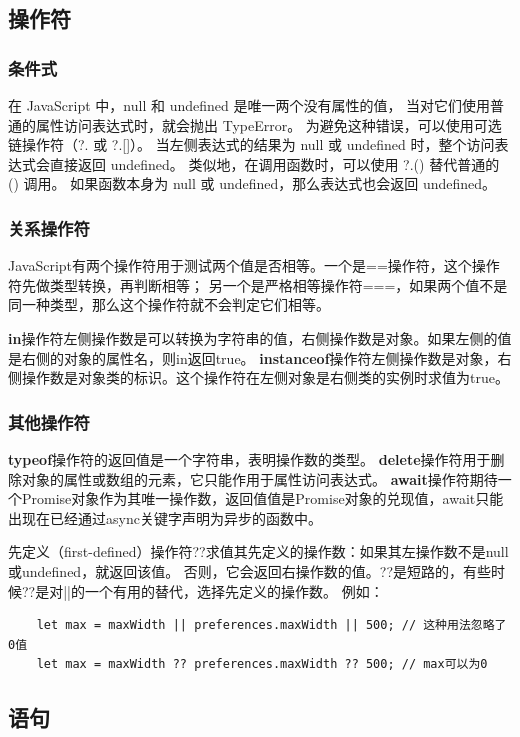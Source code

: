\subsection{操作符}
\subsubsection{条件式}
在 JavaScript 中，null 和 undefined 是唯一两个没有属性的值，
当对它们使用普通的属性访问表达式时，就会抛出 TypeError。
为避免这种错误，可以使用可选链操作符（?. 或 ?.[]）。
当左侧表达式的结果为 null 或 undefined 时，整个访问表达式会直接返回 undefined。
类似地，在调用函数时，可以使用 ?.() 替代普通的 () 调用。
如果函数本身为 null 或 undefined，那么表达式也会返回 undefined。

\subsubsection{关系操作符}
JavaScript有两个操作符用于测试两个值是否相等。一个是==操作符，这个操作符先做类型转换，再判断相等；
另一个是严格相等操作符===，如果两个值不是同一种类型，那么这个操作符就不会判定它们相等。

\textbf{in}操作符左侧操作数是可以转换为字符串的值，右侧操作数是对象。如果左侧的值是右侧的对象的属性名，则in返回true。
\textbf{instanceof}操作符左侧操作数是对象，右侧操作数是对象类的标识。这个操作符在左侧对象是右侧类的实例时求值为true。

\subsubsection{其他操作符}
\textbf{typeof}操作符的返回值是一个字符串，表明操作数的类型。
\textbf{delete}操作符用于删除对象的属性或数组的元素，它只能作用于属性访问表达式。
\textbf{await}操作符期待一个Promise对象作为其唯一操作数，返回值值是Promise对象的兑现值，await只能出现在已经通过async关键字声明为异步的函数中。

先定义（first-defined）操作符??求值其先定义的操作数：如果其左操作数不是null或undefined，就返回该值。
否则，它会返回右操作数的值。??是短路的，有些时候??是对||的一个有用的替代，选择先定义的操作数。
例如：
\begin{verbatim}
    let max = maxWidth || preferences.maxWidth || 500; // 这种用法忽略了0值
    let max = maxWidth ?? preferences.maxWidth ?? 500; // max可以为0
\end{verbatim}

\subsection{语句}

